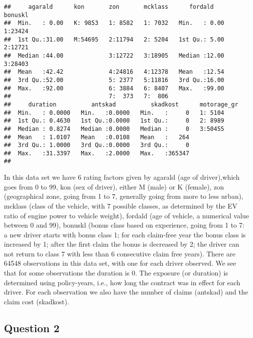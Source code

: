 \documentclass[
]{article}
\begin{document}
\begin{verbatim}
##     agarald      kon       zon       mcklass      fordald      bonuskl  
##  Min.   : 0.00   K: 9853   1: 8582   1: 7032   Min.   : 0.00   1:23424  
##  1st Qu.:31.00   M:54695   2:11794   2: 5204   1st Qu.: 5.00   2:12721  
##  Median :44.00             3:12722   3:18905   Median :12.00   3:28403  
##  Mean   :42.42             4:24816   4:12378   Mean   :12.54            
##  3rd Qu.:52.00             5: 2377   5:11816   3rd Qu.:16.00            
##  Max.   :92.00             6: 3884   6: 8407   Max.   :99.00            
##                            7:  373   7:  806                            
##     duration          antskad          skadkost      motorage_gr
##  Min.   : 0.0000   Min.   :0.0000   Min.   :     0   1: 5104    
##  1st Qu.: 0.4630   1st Qu.:0.0000   1st Qu.:     0   2: 8989    
##  Median : 0.8274   Median :0.0000   Median :     0   3:50455    
##  Mean   : 1.0107   Mean   :0.0108   Mean   :   264              
##  3rd Qu.: 1.0000   3rd Qu.:0.0000   3rd Qu.:     0              
##  Max.   :31.3397   Max.   :2.0000   Max.   :365347              
## 
\end{verbatim}

In this data set we have 6 rating factors given by agarald (age of
driver),which goes from 0 to 99, kon (sex of driver), either M (male) or
K (female), zon (geographical zone, going from 1 to 7, generally going
from more to less urban), mcklass (class of the vehicle, with 7 possible
classes, as determined by the EV ratio of engine power to vehicle
weight), fordald (age of vehicle, a numerical value between 0 and 99),
bonuskl (bonus class based on experience, going from 1 to 7: a new
driver starts with bonus class 1; for each claim-free year the bonus
class is increased by 1; after the first claim the bonus is decreased by
2; the driver can not return to class 7 with less than 6 consecutive
claim free years). There are 64548 observations in this data set, with
one for each driver observed. We see that for some observations the
duration is 0. The exposure (or duration) is determined using
policy-years, i.e., how long the contract was in effect for each driver.
For each observation we also have the number of claims (antskad) and the
claim cost (skadkost).

\hypertarget{question-2}{%
\subsection{Question 2}\label{question-2}}
\end{document}
